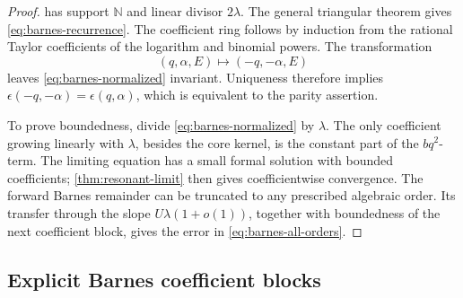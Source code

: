 \documentclass[11pt,oneside]{article}
\theoremstyle{plain}
\theoremstyle{definition}
\theoremstyle{remark}
\newcommand{\N}{\mathbb{N}}
\begin{document}
\begin{proof}
 has support \(\N\) and linear divisor
\(2\lambda\).  The general triangular theorem gives
\cref{eq:barnes-recurrence}.  The coefficient ring follows by induction from
the rational Taylor coefficients of the logarithm and binomial powers.  The
transformation
\begin{equation}
 (q,\alpha,E)\longmapsto(-q,-\alpha,E)
 \label{eq:barnes-parity-transform}
\end{equation}
leaves \cref{eq:barnes-normalized} invariant.  Uniqueness therefore implies
\(\epsilon(-q,-\alpha)=\epsilon(q,\alpha)\), which is equivalent to the
parity assertion.

To prove boundedness, divide \cref{eq:barnes-normalized} by \(\lambda\).
The only coefficient growing linearly with \(\lambda\), besides the core
kernel, is the constant part of the \(bq^2\)-term.  The limiting equation has a
small formal solution with bounded coefficients; \cref{thm:resonant-limit}
then gives coefficientwise convergence.  The forward Barnes remainder can be
truncated to any prescribed algebraic order.  Its transfer through the slope
\(U\lambda(1+o(1))\), together with boundedness of the next coefficient block,
gives the error in \cref{eq:barnes-all-orders}.
\end{proof}

\subsection{Explicit Barnes coefficient blocks}
\end{document}
